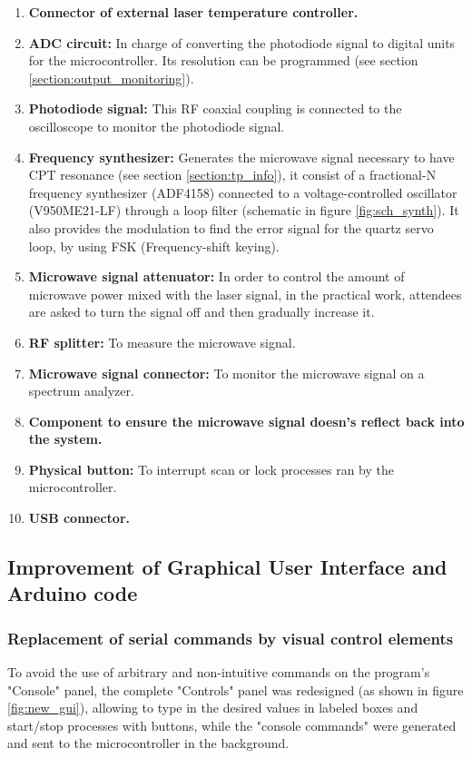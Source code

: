 \documentclass[a4paper,12pt]{article}
\begin{document}
\begin{enumerate}[wide, labelwidth=!, labelindent=0pt]
    \item \textbf{Connector of external laser temperature controller.}
    \item \textbf{ADC circuit:} In charge of converting the photodiode signal to digital units for the microcontroller. Its resolution can be programmed (see section \ref{section:output_monitoring}).
    \item \textbf{Photodiode signal: } This RF coaxial coupling is connected to the oscilloscope to monitor the photodiode signal.
    \item \textbf{Frequency synthesizer: } Generates the microwave signal necessary to have CPT resonance (see section \ref{section:tp_info}), it consist of a fractional-N frequency synthesizer (ADF4158) connected to a voltage-controlled oscillator (V950ME21-LF) through a loop filter (schematic in figure \ref{fig:sch_synth}). It also provides the modulation to find the error signal for the quartz servo loop, by using FSK (Frequency-shift keying). 
    \item \textbf{Microwave signal attenuator:} In order to control the amount of microwave power mixed with the laser signal, in the practical work, attendees are asked to turn the signal off and then gradually increase it.
    \item \textbf{RF splitter:} To measure the microwave signal.
    \item \textbf{Microwave signal connector: } To monitor the microwave signal on a spectrum analyzer.
    \item \textbf{Component to ensure the microwave signal doesn's reflect back into the system.}
    \item \textbf{Physical button:} To interrupt scan or lock processes ran by the microcontroller.
    \item \textbf{USB connector.}
\end{enumerate}

\newpage
\subsection{Improvement of Graphical User Interface and Arduino code}

\subsubsection{Replacement of serial commands by visual control elements}
\label{section:replacement_serial}

To avoid the use of arbitrary and non-intuitive commands on the program's "Console" panel, the complete "Controls" panel was redesigned (as shown in figure \ref{fig:new_gui}), allowing to type in the desired values in labeled boxes and start\slash stop processes with buttons, while the "console commands" were generated and sent to the microcontroller in the background. 
\end{document}
